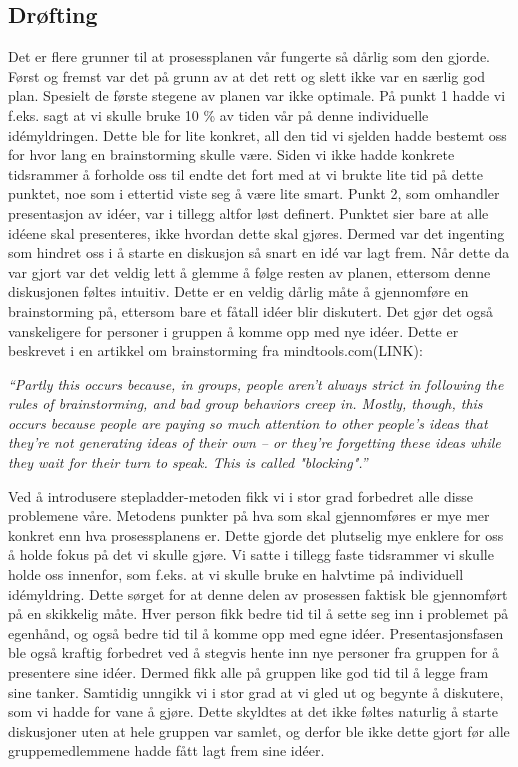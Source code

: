 \subsection{Drøfting}
Det er flere grunner til at prosessplanen vår fungerte så dårlig som den gjorde. Først og fremst var det på grunn av at det rett og slett ikke var en særlig god plan. Spesielt de første stegene av planen var ikke optimale. På punkt 1 hadde vi f.eks. sagt at vi skulle bruke 10 \% av tiden vår på denne individuelle idémyldringen. Dette ble for lite konkret, all den tid vi sjelden hadde bestemt oss for hvor lang en brainstorming skulle være. Siden vi ikke hadde konkrete tidsrammer å forholde oss til endte det fort med at vi brukte lite tid på dette punktet, noe som i ettertid viste seg å være lite smart. Punkt 2, som omhandler presentasjon av idéer, var i tillegg altfor løst definert. Punktet sier bare at alle idéene skal presenteres, ikke hvordan dette skal gjøres. Dermed var det ingenting som hindret oss i å starte en diskusjon så snart en idé var lagt frem. Når dette da var gjort var det veldig lett å glemme å følge resten av planen, ettersom denne diskusjonen føltes intuitiv. Dette er en veldig dårlig måte å gjennomføre en brainstorming på, ettersom bare et fåtall idéer blir diskutert. Det gjør det også vanskeligere for personer i gruppen å komme opp med nye idéer. Dette er beskrevet i en artikkel om brainstorming fra mindtools.com(LINK): \newline

\emph{“Partly this occurs because, in groups, people aren’t always strict in following the rules of brainstorming, and bad group behaviors creep in. Mostly, though, this occurs because people are paying so much attention to other people’s ideas that they're not generating ideas of their own – or they're forgetting these ideas while they wait for their turn to speak. This is called "blocking".”} \newline

Ved å introdusere stepladder-metoden fikk vi i stor grad forbedret alle disse problemene våre. Metodens punkter på hva som skal gjennomføres er mye mer konkret enn hva prosessplanens er. Dette gjorde det plutselig mye enklere for oss å holde fokus på det vi skulle gjøre. Vi satte i tillegg faste tidsrammer vi skulle holde oss innenfor, som f.eks. at vi skulle bruke en halvtime på individuell idémyldring. Dette sørget for at denne delen av prosessen faktisk ble gjennomført på en skikkelig måte. Hver person fikk bedre tid til å sette seg inn i problemet på egenhånd, og også bedre tid til å komme opp med egne idéer. Presentasjonsfasen ble også kraftig forbedret ved å stegvis hente inn nye personer fra gruppen for å presentere sine idéer. Dermed fikk alle på gruppen like god tid til å legge fram sine tanker. Samtidig unngikk vi i stor grad at vi gled ut og begynte å diskutere, som vi hadde for vane å gjøre. Dette skyldtes at det ikke føltes naturlig å starte diskusjoner uten at hele gruppen var samlet, og derfor ble ikke dette gjort før alle gruppemedlemmene hadde fått lagt frem sine idéer. 
